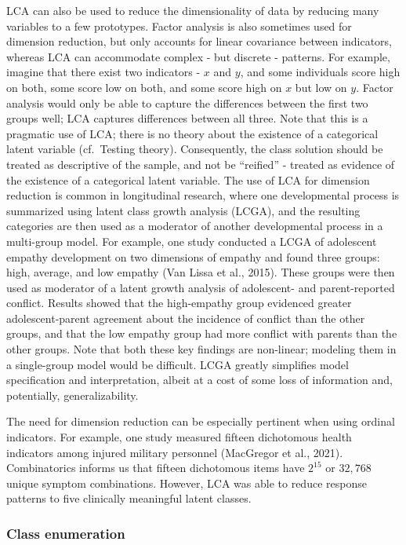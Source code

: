 \documentclass[
  ,man,floatsintext]{apa6}
\begin{document}
LCA can also be used to reduce the dimensionality of data
by reducing many variables to a few prototypes.
Factor analysis is also sometimes used for dimension reduction,
but only accounts for linear covariance between indicators,
whereas LCA can accommodate complex - but discrete - patterns.
For example, imagine that there exist two indicators - \(x\) and \(y\), and some individuals score high on both, some score low on both, and some score high on \(x\) but low on \(y\).
Factor analysis would only be able to capture the differences between the first two groups well; LCA captures differences between all three.
Note that this is a pragmatic use of LCA;
there is no theory about the existence of a categorical latent variable (cf.~Testing theory).
Consequently, the class solution should be treated as descriptive of the sample,
and not be ``reified'' - treated as evidence of the existence of a categorical latent variable.
The use of LCA for dimension reduction is common in longitudinal research,
where one developmental process is summarized using latent class growth analysis (LCGA),
and the resulting categories are then used as a moderator of another developmental process in a multi-group model.
For example, one study conducted a LCGA of adolescent empathy development on two dimensions of empathy and found three groups: high, average, and low empathy (Van Lissa et al., 2015).
These groups were then used as moderator of a latent growth analysis of adolescent- and parent-reported conflict.
Results showed that the high-empathy group evidenced greater adolescent-parent agreement about the incidence of conflict than the other groups,
and that the low empathy group had more conflict with parents than the other groups.
Note that both these key findings are non-linear;
modeling them in a single-group model would be difficult.
LCGA greatly simplifies model specification and interpretation,
albeit at a cost of some loss of information and, potentially, generalizability.

The need for dimension reduction can be especially pertinent when using ordinal indicators.
For example, one study measured
fifteen dichotomous health indicators among injured military personnel (MacGregor et al., 2021).
Combinatorics informs us that fifteen
dichotomous items have \(2^{15}\) or \(32,768\) unique symptom combinations.
However, LCA was able to reduce response patterns to five clinically meaningful latent classes.

\hypertarget{class-enumeration}{%
\subsubsection{Class enumeration}\label{class-enumeration}}
\end{document}
